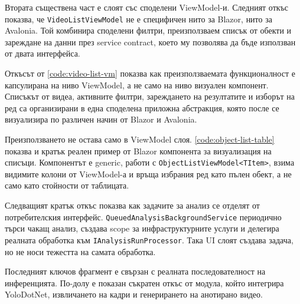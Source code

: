 Втората съществена част е слоят със споделени ViewModel-и. Следният откъс показва, че \texttt{VideoListViewModel} не е специфичен нито за Blazor, нито за Avalonia. Той комбинира споделени филтри, преизползваем списък от обекти и зареждане на данни през service contract, което му позволява да бъде използван от двата интерфейса.



Откъсът от \cref{code:video-list-vm} показва как преизползваемата функционалност е капсулирана на ниво ViewModel, а не само на ниво визуален компонент. Списъкът от видеа, активните филтри, зареждането на резултатите и изборът на ред са организирани в една споделена приложна абстракция, която после се визуализира по различен начин от Blazor и Avalonia.

Преизползването не остава само в ViewModel слоя. \cref{code:object-list-table} показва и кратък реален пример от Blazor компонента за визуализация на списъци. Компонентът е generic, работи с \texttt{ObjectListViewModel<TItem>}, взима видимите колони от ViewModel-а и връща избрания ред като пълен обект, а не само като стойности от таблицата.



Следващият кратък откъс показва как задачите за анализ се отделят от потребителския интерфейс. \texttt{QueuedAnalysisBackgroundService} периодично търси чакащ анализ, създава scope за инфраструктурните услуги и делегира реалната обработка към \texttt{IAnalysisRunProcessor}. Така UI слоят създава задача, но не носи тежестта на самата обработка.



Последният ключов фрагмент е свързан с реалната последователност на инференцията. По-долу е показан съкратен откъс от модула, който интегрира YoloDotNet, извличането на кадри и генерирането на анотирано видео.

